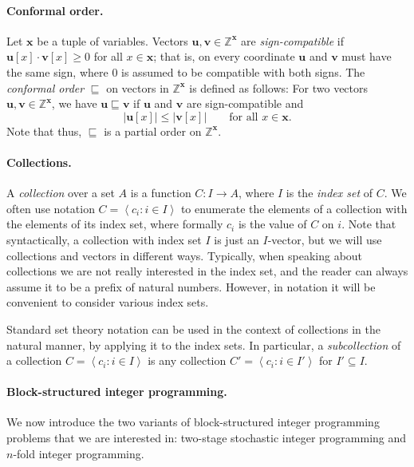 \documentclass{article}
\renewcommand{\leq}{\leqslant}
\renewcommand{\geq}{\geqslant}
\newcommand{\cfleq}{\sqsubseteq}
\newcommand{\Z}{\mathbb{Z}}
\newcommand{\tup}[1]{{\mathbf{#1}}}
\newcommand{\xx}{\tup x}
\newcommand{\uu}{\tup u}
\newcommand{\myvv}{\tup v} %
\newcommand{\mset}[1]{\left\langle #1\right\rangle}
\newcommand{\nfold}{$n$-fold}
\newcommand{\stage}{two-stage stochastic}
\begin{document}
\paragraph*{Conformal order.} Let $\xx$ be a tuple of variables. Vectors $\uu,\myvv\in \Z^{\xx}$ are {\em{sign-compatible}} if $\uu[x]\cdot \myvv[x]\geq 0$ for all $x\in \xx$; that is, on every coordinate $\uu$ and $\myvv$ must have the same sign, where $0$ is assumed to be compatible with both signs.
The {\em{conformal order}} $\cfleq$ on vectors in $\Z^{\xx}$ is defined as follows: For two vectors $\uu,\myvv\in \Z^{\xx}$, we have $\uu\cfleq \myvv$ if $\uu$ and $\myvv$ are sign-compatible and
$$|\uu[x]|\leq |\myvv[x]|\qquad \textrm{for all }x\in \xx.$$
Note that thus, $\cfleq$ is a partial order on $\Z^{\xx}$.

\paragraph*{Collections.} A {\em{collection}} over a set $A$ is a function $C\colon I\to A$, where $I$ is the {\em{index set}} of $C$.
We often use notation $C=\mset{c_i\colon i\in I}$ to enumerate the elements of a collection with the elements of its index set, where formally $c_i$ is the value of $C$ on $i$. Note that syntactically, a collection with index set $I$  is just an $I$-vector, but we will use collections and vectors in different ways. Typically, when speaking about collections we are not really interested in the index set, and the reader can always assume it to be a prefix of natural numbers. However, in notation it will be convenient to consider various index sets.

Standard set theory notation can be used in the context of  collections in the natural manner, by applying it to the index sets. In particular, a {\em{subcollection}} of a collection $C=\mset{c_i\colon i\in I}$ is any collection $C'=\mset{c_i\colon i\in I'}$ for $I'\subseteq I$.

\paragraph*{Block-structured integer programming.} We now introduce the two variants of block-structured integer programming problems that we are interested in: \stage{} integer programming and \nfold{} integer programming.
\end{document}
